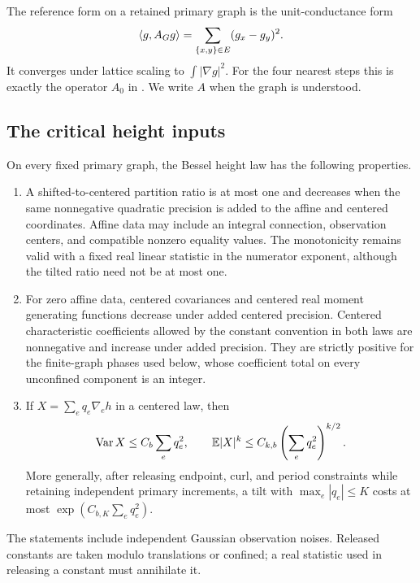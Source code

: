 The reference form on a retained primary graph is the unit-conductance
form
\begin{equation}\label{eq:reference-energy}
 \langle g,A_Gg\rangle=\sum_{\{x,y\}\in E}(g_x-g_y)^2.
\end{equation}
It converges under lattice scaling to \(\int|\nabla g|^2\).
For the four nearest steps this is exactly the operator \(A_0\) in
\cite{B}.  We write \(A\) when the graph is understood.

\subsection{The critical height inputs}

\begin{proposition}\label{prop:comparisons}
On every fixed primary graph, the Bessel height law has the following
properties.
\begin{enumerate}
\item A shifted-to-centered partition ratio is at most one and
decreases when the same nonnegative quadratic precision is added to
the affine and centered coordinates.  Affine data may include an
integral connection, observation centers, and compatible nonzero
equality values.  The monotonicity remains valid with a fixed real
linear statistic in the numerator exponent, although the tilted
ratio need not be at most one.
\item For zero affine data, centered covariances and centered real moment generating
functions decrease under added centered precision.  Centered
characteristic coefficients allowed by the constant convention in both
laws are nonnegative and increase under added precision.  They are
strictly positive for the finite-graph phases
used below, whose coefficient total on every unconfined component is
an integer.
\item If \(X=\sum_e q_e\nabla_eh\) in a centered law, then
\[
 \operatorname{Var} X\le C_b\sum_eq_e^2,\qquad
 \mathbb E|X|^k\le C_{k,b}\left(\sum_eq_e^2\right)^{k/2}.
\]
More generally, after releasing endpoint, curl, and period constraints
while retaining independent primary increments, a tilt with
\(\max_e|q_e|\le K\) costs at most
\(\exp(C_{b,K}\sum_eq_e^2)\).
\end{enumerate}
The statements include independent Gaussian observation noises.
Released constants are taken modulo translations or confined; a real
statistic used in releasing a constant must annihilate it.
\end{proposition}

